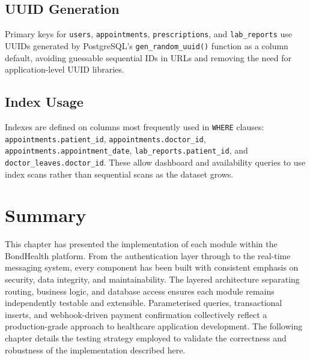 \subsection{UUID Generation}
\label{subsec:uuid}

Primary keys for \texttt{users}, \texttt{appointments}, \texttt{prescriptions}, and \texttt{lab\_reports} use UUIDs generated by PostgreSQL's \texttt{gen\_random\_uuid()} function as a column default, avoiding guessable sequential IDs in URLs and removing the need for application-level UUID libraries.

\subsection{Index Usage}
\label{subsec:indexes}

Indexes are defined on columns most frequently used in \texttt{WHERE} clauses: \texttt{appointments.patient\_id}, \texttt{appointments.doctor\_id}, \texttt{appointments.appointment\_date}, \texttt{lab\_reports.patient\_id}, and \texttt{doctor\_leaves.doctor\_id}. These allow dashboard and availability queries to use index scans rather than sequential scans as the dataset grows.

\section{Summary}
\label{sec:implementation-summary}

This chapter has presented the implementation of each module within the BondHealth platform. From the authentication layer through to the real-time messaging system, every component has been built with consistent emphasis on security, data integrity, and maintainability. The layered architecture separating routing, business logic, and database access ensures each module remains independently testable and extensible. Parameterised queries, transactional inserts, and webhook-driven payment confirmation collectively reflect a production-grade approach to healthcare application development. The following chapter details the testing strategy employed to validate the correctness and robustness of the implementation described here.